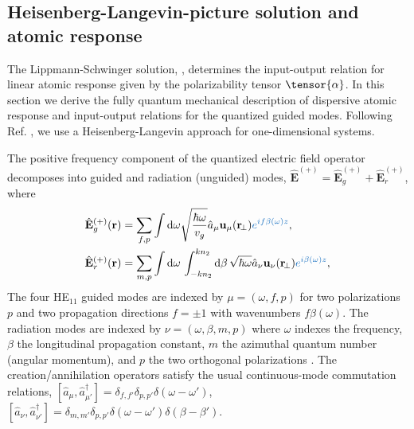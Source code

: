 \documentclass[preprint,aps,pra,onecolumn]{revtex4-1} %
\newcommand{\change}[1]{{\color{RoyalBlue} #1}}
\begin{document}
\subsection{Heisenberg-Langevin-picture solution and atomic response}
The Lippmann-Schwinger solution, , determines the input-output relation for linear atomic response given by the polarizability tensor $\tensor{\alpha}$.  In this section we derive the fully quantum mechanical description of dispersive atomic response and input-output relations for the quantized guided modes.  Following Ref. \cite{le_kien_spontaneous_2005}, we use a Heisenberg-Langevin approach for one-dimensional systems.  

The positive frequency component of the quantized electric field operator decomposes into guided and radiation (unguided) modes, $\hat{\mathbf{E}}^{(+)}=\hat{\mathbf{E}}_g^{(+)}+\hat{\mathbf{E}}_{r}^{(+)}$, where
\begin{align}
\hat{\mathbf{E}}_g^{(+)}(\br) &= \sum_{f,p} \int \mathrm{d}\omega \sqrt{\frac{ \hbar \omega}{v_g}} 
\hat{a}_\mu \mathbf{u}_\mu (\br\!_\perp) \change{  e^{if\beta(\omega) z} },\label{Eq::QuantizedElectricField} \\
\hat{\mathbf{E}}_r^{(+)}(\br) &= \sum_{m,p} \int \mathrm{d}\omega  \, \int_{-kn_2}^{kn_2}\mathrm{d}\beta \, 
\sqrt{ \hbar \omega} \hat{a}_\nu \mathbf{u}_\nu (\br\!_\perp) \change{ e^{i\beta(\omega) z} },
\end{align}
The four HE$_{11}$ guided modes are indexed by $\mu =(\omega, f, p)$ for two polarizations $p$ and two propagation directions $f=\pm1$ with wavenumbers $f\beta (\omega)$.  The radiation modes are indexed by \change{ $\nu=(\omega, \beta, m, p)$ where $\omega$ indexes the frequency, $\beta$ the longitudinal propagation constant, $m$ the azimuthal quantum number (angular momentum), and $p$ the two orthogonal polarizations} \cite{sondergaard_general_2001}.  The creation/annihilation operators satisfy the usual continuous-mode commutation relations, $[\hat{a}_\mu, \hat{a}^\dag_{\mu'} ] = \delta_{f,f'} \delta_{p,p'} 
\delta ( \omega - \omega ') $, $[\hat{a}_\nu ,\hat{a}^\dag_{\nu'} ] = \delta_{m,m'} \delta_{p,p'} \delta ( 
\omega - \omega ')  \delta ( \beta - \beta') $.
\end{document}
